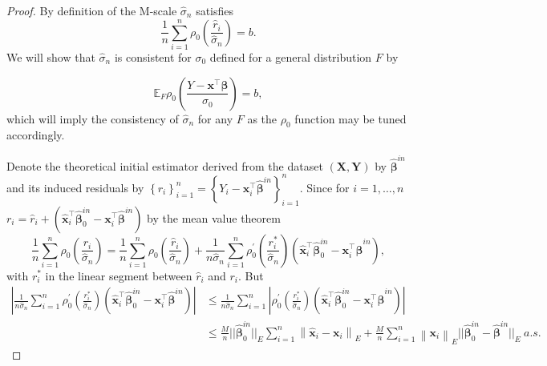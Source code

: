 \documentclass[11pt]{article}
\begin{document}
\begin{proof}
By definition of the M-scale $\widehat{\sigma}_n$ satisfies
\begin{equation}
\frac{1}{n} \sum_{i=1}^n \rho_{0} \left( \frac{\widehat{r}_i}{\widehat{\sigma}_n} \right) = b.
\end{equation}
We will show that $\widehat{\sigma}_n$ is consistent for $\sigma_0$ defined for a general distribution $F$ by

\begin{equation}
\mathbb{E}_F \rho_{0} \left( \frac{Y-\mathbf{x}^{\top} \boldsymbol{\beta}}{\sigma_0} \right) = b,
\end{equation}
which will imply the consistency of $\widehat{\sigma}_n$ for any $F$ as the $\rho_0$ function may be tuned accordingly.

Denote the theoretical initial estimator derived from the dataset $\left(\mathbf{X}, \mathbf{Y} \right)$ by $\widehat{\boldsymbol{\beta}}^{in}$ and its induced residuals by $\left\{r_i \right\}_{i=1}^n = \left\{Y_i - \mathbf{x}_i^{\top} \widehat{\boldsymbol{\beta}}^{in} \right\}_{i=1}^n$. Since for $i=1, \ldots, n$ $r_i = \widehat{r}_i + \left(\widehat{\mathbf{x}}_i^{\top}\widehat{\boldsymbol{\beta}}^{in}_0 -\mathbf{x}_i^{\top
} \widehat{\boldsymbol{\beta}}^{in}  \right)$ by the mean value theorem
\begin{equation}
\frac{1}{n} \sum_{i=1}^n \rho_0 \left( \frac{r_i}{\widehat{\sigma}_n} \right) = \frac{1}{n} \sum_{i=1}^n \rho_0 \left( \frac{\widehat{r}_i}{\widehat{\sigma}_n} \right) + \frac{1}{n \widehat{\sigma}_n} \sum_{i=1}^n \rho^{\prime}_0 \left( \frac{r_i^{*}}{\widehat{\sigma}_n} \right) \left(\widehat{\mathbf{x}}_i^{\top}\widehat{\boldsymbol{\beta}}^{in}_0 -\mathbf{x}_i^{\top} \widehat{\boldsymbol{\beta}}^{in}  \right),
\end{equation}
with $r_i^{*}$ in the linear segment between $\widehat{r}_i$ and $r_i$. But 
\begin{align*}
\left| \frac{1}{n\widehat{\sigma}_n} \sum_{i=1}^n \rho^{\prime}_0 \left( \frac{r_i^{*}}{\widehat{\sigma}_n} \right) \left(\widehat{\mathbf{x}}_i^{\top}\widehat{\boldsymbol{\beta}}^{in}_0 -\mathbf{x}_i^{\top} \widehat{\boldsymbol{\beta}}^{in}  \right) \right| & \leq \frac{1}{n\widehat{\sigma}_n} \sum_{i=1}^n \left| \rho^{\prime}_0 \left( \frac{r_i^{*}}{\widehat{\sigma}_n} \right) \left(\widehat{\mathbf{x}}_i^{\top}\widehat{\boldsymbol{\beta}}^{in}_0 -\mathbf{x}_i^{\top} \widehat{\boldsymbol{\beta}}^{in}  \right) \right| 
\\ & \leq \frac{M}{n}  || \widehat{\boldsymbol{\beta}}^{in}_0||_{E} \sum_{i=1}^n \left\| \mathbf{\widehat{x}}_i - \mathbf{x}_i  \right\|_{E} + \frac{M}{n} \sum_{i=1}^n \left\|\mathbf{x}_i \right\|_{E} || \widehat{\boldsymbol{\beta}}^{in}_0 - \widehat{\boldsymbol{\beta}}^{in}||_{E} \  a.s.

\end{align*}
\end{proof}
\end{document}
